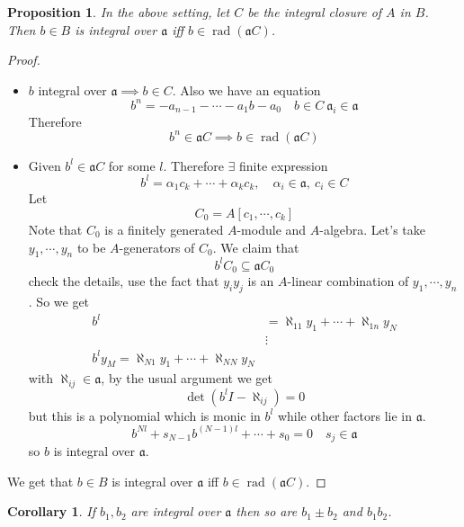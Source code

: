 \documentclass[11pt,a4paper]{article}
\theoremstyle{definition}
\theoremstyle{plain}
\newtheorem{proposition}[definition]{Proposition}
\newtheorem{corollary}[definition]{Corollary}
\theoremstyle{remark}
\newcommand{\rad}{\operatorname{rad}}
\begin{document}
\begin{proposition}
    In the above setting, let $C$ be the integral closure of $A$ in $B$. Then $b \in B$ is integral over $\mathfrak{a}$ iff 
    $b \in \rad (\mathfrak{a}C)$.
\end{proposition}

\begin{proof}
    \begin{itemize}
        \item[$\implies$] $b$ integral over $\mathfrak{a} \implies b \in C$. Also we have an equation 
        $$b^n = - a_{n-1} - \cdots - a_1 b - a_0 \quad b \in C \ \mathfrak{a}_i \in \mathfrak{a}$$
        Therefore 
        $$b^n \in \mathfrak{a}C \implies b \in \rad (\mathfrak{a}C)$$

        \item[$\impliedby$] Given $b^l \in \mathfrak{a}C$ for some $l$. Therefore $\exists$ finite expression 
        $$b^l = \alpha_1 c_k + \cdots + \alpha_k c_k, \quad \alpha_i \in \mathfrak{a}, \ c_i \in C$$
        Let 
        $$C_0 = A[c_1, \cdots, c_k]$$
        Note that $C_0$ is a finitely generated $A$-module and $A$-algebra. Let's take $y_1, \cdots, y_n$ to be $A$-generators of 
        $C_0$. We claim that 
        $$b^l C_0 \subseteq \mathfrak{a} C_0$$
        check the details, use the fact that $y_i y_j$ is an $A$-linear combination of $y_1, \cdots, y_n$. 
        So we get 
        \begin{align*}
            b^l &= \aleph_{11} y_1 + \cdots + \aleph_{1n} y_N\\
            &\vdots \\
            b^l y_M = \aleph_{N1} y_1 + \cdots + \aleph_{NN}y_N
        \end{align*} 
        with $\aleph_{ij} \in \mathfrak{a}$, by the usual argument we get 
        $$\det (b^l I - \aleph_{ij}) = 0$$
        but this is a polynomial which is monic in $b^l$ while other factors lie in $\mathfrak{a}$. 
        $$b^{Nl} + s_{N-1} b^{(N-1)l} + \cdots + s_0 = 0 \quad s_j \in \mathfrak{a}$$
        so $b$ is integral over $\mathfrak{a}$.
    \end{itemize}   
    We get that $b \in B$ is integral over $\mathfrak{a}$ iff $b \in \rad (\mathfrak{a}C)$.
\end{proof}

\begin{corollary}
    If $b_1, b_2$ are integral over $\mathfrak{a}$ then so are $b_1 \pm b_2$ and $b_1b_2$. 
\end{corollary}
\end{document}
